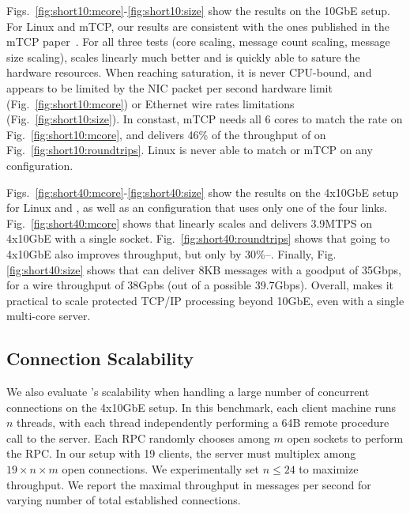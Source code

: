 
 Figs.~\ref{fig:short10:mcore}-\ref{fig:short10:size} show the results
on the 10GbE setup.  For Linux and mTCP, our results are consistent
with the ones published in the mTCP paper~\cite{jeong2014mtcp}.  For
all three tests (core scaling, message count scaling, message size
scaling), \ix scales linearly much better and is quickly able to
sature the hardware resources.  When reaching saturation, it is never
CPU-bound, and appears to be limited by the NIC packet per second
hardware limit (Fig.~\ref{fig:short10:mcore}) or Ethernet wire rates
limitations (Fig.~\ref{fig:short10:size}).  In constast, mTCP needs
all 6 cores to match the rate on Fig.~\ref{fig:short10:mcore}, and
delivers 46\% of the throughput of \ix on
Fig.~\ref{fig:short10:roundtrips}.  Linux is never able to match \ix
or mTCP on any configuration.



 Figs.~\ref{fig:short40:mcore}-\ref{fig:short40:size} show the results
on the 4x10GbE setup for Linux and \ix, as well as an \ix
configuration that uses only one of the four
links. Fig.~\ref{fig:short40:mcore} shows that \ix linearly scales and
delivers 3.9MTPS on 4x10GbE with a single socket.
Fig.~\ref{fig:short40:roundtrips} shows that going to 4x10GbE also
improves throughput, but only by 30\%--.  Finally,
Fig.\ref{fig:short40:size} shows that \ix can deliver 8KB messages
with a goodput of 35Gbps, for a wire throughput of 38Gpbs (out of a
possible 39.7Gbps).  Overall, \ix makes it practical to scale
protected TCP/IP processing beyond 10GbE, even with a single
multi-core server.


\subsection{Connection Scalability}

\label{sec:eval:scale}

We also evaluate \ix's scalability when handling a large number of
concurrent connections on the 4x10GbE setup. In this benchmark, each client machine runs
$n$ threads, with each thread independently performing a 64B remote
procedure call to the server.  Each RPC randomly chooses among $m$
open sockets to perform the RPC.  In our setup with 19 clients, the
server must multiplex among $19 \times n \times m$ open connections.
We experimentally set $n \leq 24$ to maximize throughput.  We report
the maximal throughput in messages per second for varying number of
total established connections.

